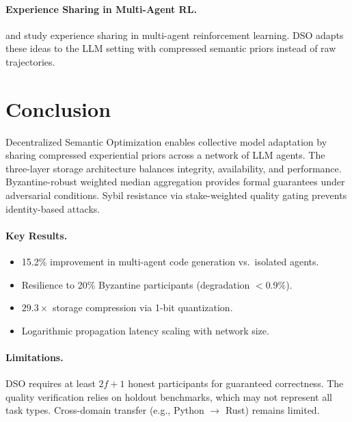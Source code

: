 \documentclass[11pt]{article}
\begin{document}
\paragraph{Experience Sharing in Multi-Agent RL.}
\cite{christianos2021scaling} and \cite{baker2020emergent} study experience
sharing in multi-agent reinforcement learning. DSO adapts these ideas to the
LLM setting with compressed semantic priors instead of raw trajectories.

\section{Conclusion}
\label{sec:conclusion}

Decentralized Semantic Optimization enables collective model adaptation by
sharing compressed experiential priors across a network of LLM agents. The
three-layer storage architecture balances integrity, availability, and
performance. Byzantine-robust weighted median aggregation provides formal
guarantees under adversarial conditions. Sybil resistance via stake-weighted
quality gating prevents identity-based attacks.

\paragraph{Key Results.}
\begin{itemize}[leftmargin=1.5em]
    \item 15.2\% improvement in multi-agent code generation vs.\ isolated agents.
    \item Resilience to 20\% Byzantine participants (degradation $< 0.9\%$).
    \item $29.3\times$ storage compression via 1-bit quantization.
    \item Logarithmic propagation latency scaling with network size.
\end{itemize}

\paragraph{Limitations.}
DSO requires at least $2f + 1$ honest participants for guaranteed correctness.
The quality verification relies on holdout benchmarks, which may not represent
all task types. Cross-domain transfer (e.g., Python $\to$ Rust) remains limited.
\end{document}
